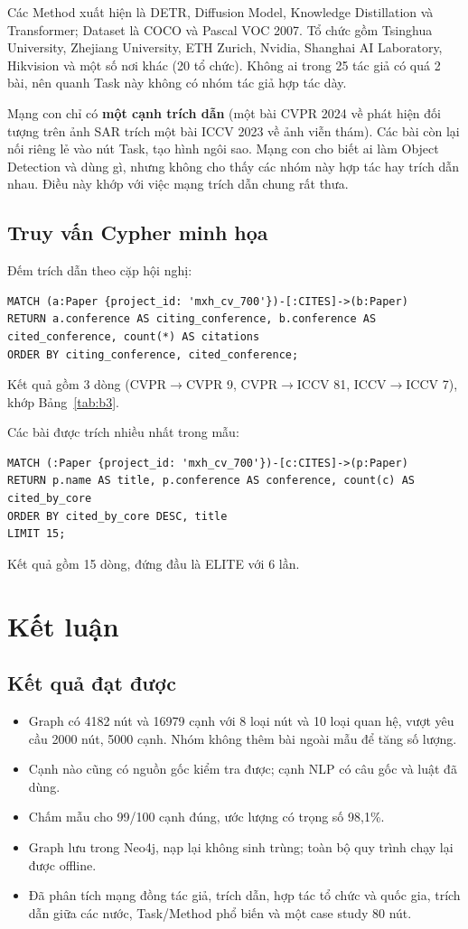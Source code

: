 \documentclass[11pt,a4paper]{article}
\begin{document}
Các Method xuất hiện là DETR, Diffusion Model, Knowledge Distillation và Transformer; Dataset là COCO và Pascal VOC 2007. Tổ chức gồm Tsinghua University, Zhejiang University, ETH Zurich, Nvidia, Shanghai AI Laboratory, Hikvision và một số nơi khác (20 tổ chức). Không ai trong 25 tác giả có quá 2 bài, nên quanh Task này không có nhóm tác giả hợp tác dày.

Mạng con chỉ có \textbf{một cạnh trích dẫn} (một bài CVPR 2024 về phát hiện đối tượng trên ảnh SAR trích một bài ICCV 2023 về ảnh viễn thám). Các bài còn lại nối riêng lẻ vào nút Task, tạo hình ngôi sao. Mạng con cho biết ai làm Object Detection và dùng gì, nhưng không cho thấy các nhóm này hợp tác hay trích dẫn nhau. Điều này khớp với việc mạng trích dẫn chung rất thưa.

\subsection{Truy vấn Cypher minh họa}\label{sec:b5.8}

Đếm trích dẫn theo cặp hội nghị:
{\small
\begin{verbatim}
MATCH (a:Paper {project_id: 'mxh_cv_700'})-[:CITES]->(b:Paper)
RETURN a.conference AS citing_conference, b.conference AS cited_conference, count(*) AS citations
ORDER BY citing_conference, cited_conference;
\end{verbatim}}
Kết quả gồm 3 dòng (CVPR$\to$CVPR 9, CVPR$\to$ICCV 81, ICCV$\to$ICCV 7), khớp Bảng~\ref{tab:b3}.

Các bài được trích nhiều nhất trong mẫu:
{\small
\begin{verbatim}
MATCH (:Paper {project_id: 'mxh_cv_700'})-[c:CITES]->(p:Paper)
RETURN p.name AS title, p.conference AS conference, count(c) AS cited_by_core
ORDER BY cited_by_core DESC, title
LIMIT 15;
\end{verbatim}}
Kết quả gồm 15 dòng, đứng đầu là ELITE với 6 lần.



\section{Kết luận}

\subsection{Kết quả đạt được}
\begin{itemize}[leftmargin=1.4em]
  \item Graph có 4182 nút và 16979 cạnh với 8 loại nút và 10 loại quan hệ, vượt yêu cầu 2000 nút, 5000 cạnh. Nhóm không thêm bài ngoài mẫu để tăng số lượng.
  \item Cạnh nào cũng có nguồn gốc kiểm tra được; cạnh NLP có câu gốc và luật đã dùng.
  \item Chấm mẫu cho 99/100 cạnh đúng, ước lượng có trọng số 98,1\%.
  \item Graph lưu trong Neo4j, nạp lại không sinh trùng; toàn bộ quy trình chạy lại được offline.
  \item Đã phân tích mạng đồng tác giả, trích dẫn, hợp tác tổ chức và quốc gia, trích dẫn giữa các nước, Task/Method phổ biến và một case study 80 nút.
\end{itemize}
\end{document}
